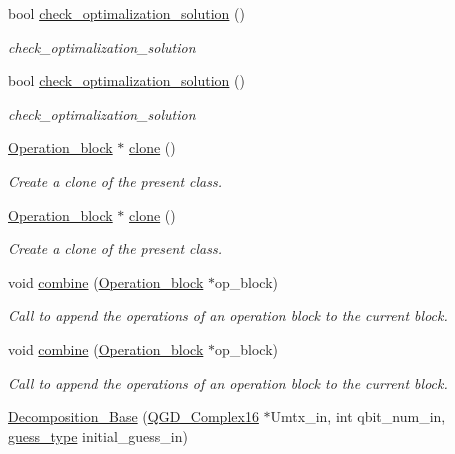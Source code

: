 \begin{DoxyCompactItemize}
bool \hyperlink{class_decomposition___base_aa01a8d70b76215a235cb0d71894b2595}{check\+\_\+optimalization\+\_\+solution} ()
\begin{DoxyCompactList}\small\item\em check\+\_\+optimalization\+\_\+solution \end{DoxyCompactList}\item 
bool \hyperlink{class_decomposition___base_aa01a8d70b76215a235cb0d71894b2595}{check\+\_\+optimalization\+\_\+solution} ()
\begin{DoxyCompactList}\small\item\em check\+\_\+optimalization\+\_\+solution \end{DoxyCompactList}\item 
\hyperlink{class_operation__block}{Operation\+\_\+block} $\ast$ \hyperlink{class_operation__block_a2aa75d20b21c3b5802730c0abe54db5e}{clone} ()
\begin{DoxyCompactList}\small\item\em Create a clone of the present class. \end{DoxyCompactList}\item 
\hyperlink{class_operation__block}{Operation\+\_\+block} $\ast$ \hyperlink{class_operation__block_af5d1f81be3a54eada1de293d1e9877c5}{clone} ()
\begin{DoxyCompactList}\small\item\em Create a clone of the present class. \end{DoxyCompactList}\item 
void \hyperlink{class_operation__block_a60062cf6f48ebfdcaae9db3367a66147}{combine} (\hyperlink{class_operation__block}{Operation\+\_\+block} $\ast$op\+\_\+block)
\begin{DoxyCompactList}\small\item\em Call to append the operations of an operation block to the current block. \end{DoxyCompactList}\item 
void \hyperlink{class_operation__block_a60062cf6f48ebfdcaae9db3367a66147}{combine} (\hyperlink{class_operation__block}{Operation\+\_\+block} $\ast$op\+\_\+block)
\begin{DoxyCompactList}\small\item\em Call to append the operations of an operation block to the current block. \end{DoxyCompactList}\item 
\hyperlink{class_decomposition___base_a1f3d192d35a7154ac02e2bb3de80cd45}{Decomposition\+\_\+\+Base} (\hyperlink{struct_q_g_d___complex16}{Q\+G\+D\+\_\+\+Complex16} $\ast$Umtx\+\_\+in, int qbit\+\_\+num\+\_\+in, \hyperlink{decomposition_2include_2_decomposition___base_8h_a0e76cf2e4eb5edbf067ba5014ffa2134}{guess\+\_\+type} initial\+\_\+guess\+\_\+in)

\end{DoxyCompactItemize}
